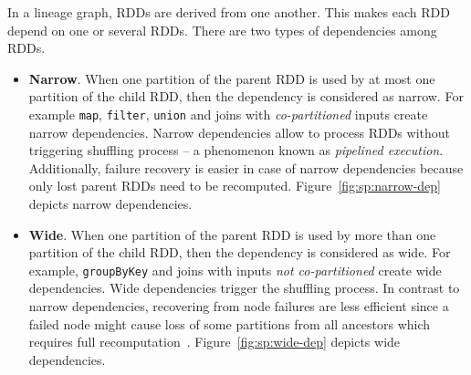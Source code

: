 In a lineage graph, RDDs are derived from one another. This makes each RDD depend on one or several RDDs. There are two types of dependencies among RDDs.
\begin{itemize}
    \item \textbf{Narrow}. When one partition of the parent RDD is used by at most one partition of the child RDD, then the dependency is considered as narrow. For example \lstinline$map$, \lstinline$filter$, \lstinline$union$ and joins with \emph{co-partitioned} inputs create narrow dependencies. Narrow dependencies allow to process RDDs without triggering shuffling process -- a phenomenon known as \emph{pipelined execution}. Additionally, failure recovery is easier in case of narrow dependencies because only lost parent RDDs need to be recomputed. Figure~\ref{fig:sp:narrow-dep} depicts narrow dependencies.
    \item \textbf{Wide}. When one partition of the parent RDD is used by more than one partition of the child RDD, then the dependency is considered as wide. For example, \lstinline$groupByKey$ and joins with inputs \emph{not co-partitioned} create wide dependencies. Wide dependencies trigger the shuffling process. In contrast to narrow dependencies, recovering from node failures are less efficient since a failed node might cause loss of some partitions from all ancestors which requires full recomputation~\cite{Zaharia:2012}. Figure~\ref{fig:sp:wide-dep} depicts wide dependencies.
\end{itemize}
